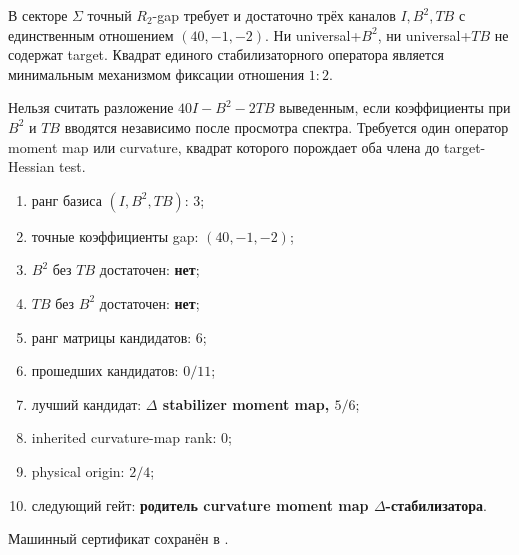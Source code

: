 \begin{theorem}
В секторе $\Sigma$ точный $R_2$-gap требует и достаточно трёх каналов
$I,B^2,TB$ с единственным отношением $(40,-1,-2)$. Ни universal+$B^2$, ни
universal+$TB$ не содержат target. Квадрат единого стабилизаторного
оператора является минимальным механизмом фиксации отношения $1:2$.
\end{theorem}

\begin{nogocriterion}
Нельзя считать разложение $40I-B^2-2TB$ выведенным, если коэффициенты при
$B^2$ и $TB$ вводятся независимо после просмотра спектра. Требуется один
оператор moment map или curvature, квадрат которого порождает оба члена до
target-Hessian test.
\end{nogocriterion}

\begin{protocol}\begin{enumerate}
\item ранг базиса $(I,B^2,TB)$: \textbf{$3$};
\item точные коэффициенты gap: \textbf{$(40,-1,-2)$};
\item $B^2$ без $TB$ достаточен: \textbf{нет};
\item $TB$ без $B^2$ достаточен: \textbf{нет};
\item ранг матрицы кандидатов: \textbf{$6$};
\item прошедших кандидатов: \textbf{$0/11$};
\item лучший кандидат: \textbf{$\Delta$ stabilizer moment map, $5/6$};
\item inherited curvature-map rank: \textbf{$0$};
\item physical origin: \textbf{$2/4$};
\item следующий гейт: \textbf{родитель curvature moment map $\Delta$-стабилизатора}.
\end{enumerate}\end{protocol}

Машинный сертификат сохранён в
.